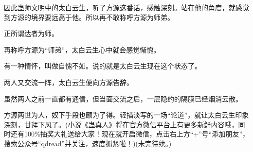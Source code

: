 \begin{this_body}
因此蛊师文明中的太白云生，听了方源这番话，感触深刻。站在他的角度，就感觉到方源的境界要远高于他。所以再不敢称呼方源为师弟。

正所谓达者为师。

再称呼方源为“师弟”，太白云生心中就会感觉惭愧。

有一种情怀，叫做自愧不如。说的就是太白云生现在这个状态了。

两人又交流一阵，太白云生便向方源告辞。

虽然两人之前一直都有通信，但当面交流之后，一层隐约的隔膜已经烟消云散。

方源两世为人，奴下手段也颇为了得。轻描淡写的一场“论道”，就让太白云生印象深刻，甘拜下风了。(小说《蛊真人》将在官方微信平台上有更多新鲜内容哦，同时还有100\%抽奖大礼送给大家！现在就开启微信，点击右上方“+”号“添加朋友”，搜索公众号“qdread”并关注，速度抓紧啦！)(未完待续。)

\end{this_body}

